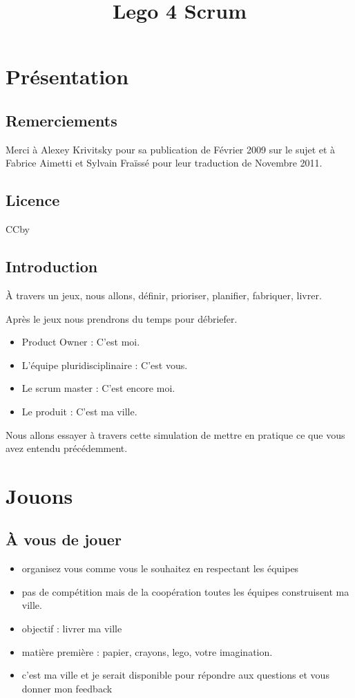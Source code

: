 \documentclass[a4paper,12pt]{article}
\title{Lego 4 Scrum}
\date{}
\begin{document}
\maketitle

\section{Présentation}

\subsection{Remerciements}
Merci à Alexey Krivitsky pour sa publication de Février 2009 sur le sujet et à  Fabrice Aimetti et Sylvain Fraïssé pour leur traduction de Novembre 2011.

\subsection{Licence}
CCby

\subsection{Introduction}
À travers un jeux, nous allons, définir, prioriser, planifier, fabriquer, livrer.

Après le jeux nous prendrons du temps pour débriefer.

\begin{itemize}
  \item Product Owner : C'est moi.
  \item L'équipe pluridisciplinaire : C'est vous.
  \item Le scrum master : C'est encore moi.
  \item Le produit : C'est ma ville.
\end{itemize}

Nous allons essayer à travers cette simulation de mettre en pratique ce que vous avez entendu précédemment.

\section{Jouons}

\subsection{À vous de jouer}

\begin{itemize}
  \item organisez vous comme vous le souhaitez en respectant les équipes 
  \item pas de compétition mais de la coopération toutes les équipes construisent ma ville.
  \item objectif : livrer ma ville
  \item matière première : papier, crayons, lego, votre imagination.
  \item c'est ma ville et je serait disponible pour répondre aux questions et vous donner mon feedback
\end{itemize}
\end{document}
